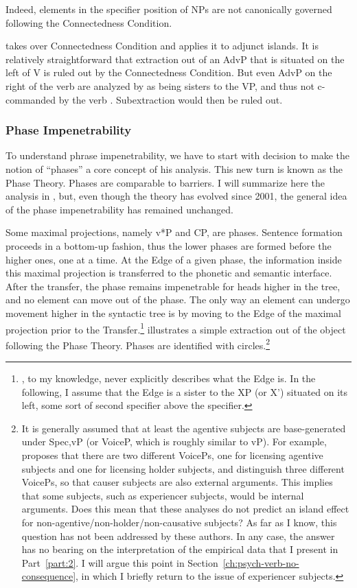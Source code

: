 Indeed, elements in the specifier position of NPs are not canonically governed following the Connectedness Condition. 

\citet{Longobardi.1985} takes over  Connectedness Condition and applies it to adjunct islands. It is relatively straightforward that extraction out of an AdvP that is situated on the left of V is ruled out by the Connectedness Condition. But even AdvP on the right of the verb are analyzed by \citet{Longobardi.1985} as being sisters to the VP, and thus not c-commanded by the verb \citep[see ex.\ 14 in][157]{Longobardi.1984}. Subextraction would then be ruled out. 

\subsubsection{Phase Impenetrability}

To understand phrase impenetrability, we have to start with  decision to make the notion of ``phases'' a core concept of his analysis. This new turn is known as the Phase Theory. Phases are comparable to barriers. I will summarize here the analysis in \citet{Chomsky.2008}, but, even though the theory has evolved since 2001, the general idea of the phase impenetrability has remained unchanged. 

Some maximal projections, namely v*P and CP, are phases. Sentence formation proceeds in a bottom-up fashion, thus the lower phases are formed before the higher ones, one at a time. At the Edge of a given phase, the information inside this maximal projection is transferred to the phonetic and semantic interface. 
After the transfer, the phase remains impenetrable for heads higher in the tree, and no element can move out of the phase. The only way an element can undergo movement higher in the syntactic tree is by moving to the Edge of the maximal projection prior to the Transfer.\footnote{\citet{Chomsky.2008}, to my knowledge, never explicitly describes what the Edge is. In the following, I assume that the Edge is a sister to the XP (or X') situated on its left, some sort of second specifier above the specifier.}
 illustrates a simple extraction out of the object following the Phase Theory. Phases are identified with circles.\footnote{It is generally assumed that at least the agentive subjects are base-generated under Spec,vP (or VoiceP, which is roughly similar to vP). For example, \citet{Kratzer.1996} proposes that there are two different VoicePs, one for licensing agentive subjects and one for licensing holder subjects, and \citet[Chapter 2]{Alexiadou.2015} distinguish three different VoicePs, so that causer subjects are also external arguments. This implies that some subjects, such as experiencer subjects, would be internal arguments. Does this mean that these analyses do not predict an island effect for non-agentive/non-holder/non-causative subjects? As far as I know, this question has not been addressed by these authors. In any case, the answer has no bearing on the interpretation of the empirical data that I present in Part~\ref{part:2}. I will argue this point in Section~\ref{ch:psych-verb-no-consequence}, in which I briefly return to the issue of experiencer subjects.}

